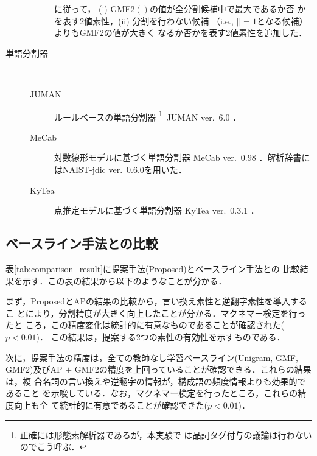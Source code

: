 \documentclass[japanese]{jnlp_1.4}
\newcommand{\y}{}
\begin{document}
\begin{description}
\begin{description}
			\citeyear{AlfonsecaCICLing08}に従って，
			(i) GMF2$(\y)$の値が全分割候補中で最大であるか否
			かを表す2値素性，(ii) 分割を行わない候補
			（i.e., $|\y|=1$となる候補）よりもGMF2の値が大きく
			なるか否かを表す2値素性を追加した．
	    \end{description}
 \item[単語分割器]　
	    \begin{description}
	     \item[JUMAN]
			ルールベースの単語分割器
			\footnote{正確には形態素解析器であるが，本実験で
			は品詞タグ付与の議論は行わないのでこう呼ぶ．}\ JUMAN ver.~6.0 \cite{Kurohashi94}．
	     \item[MeCab]
			対数線形モデルに基づく単語分割器 
			MeCab ver.~0.98 \cite{Kudo04}．解析辞書にはNAIST-jdic
			ver.~0.6.0を用いた．
	     \item[KyTea]
			点推定モデルに基づく単語分割器 KyTea ver.~0.3.1 \cite{Neubig11}．
	    \end{description}
\end{description}


\subsection{ベースライン手法との比較}
\label{sec:compare}

\begin{table}[b]
   \label{tab:comparison_result}

\vspace{-0.5\Cvs}
\end{table}

表\ref{tab:comparison_result}に提案手法(Proposed)とベースライン手法との
比較結果を示す．この表の結果から以下のようなことが分かる．

まず，ProposedとAPの結果の比較から，言い換え素性と逆翻字素性を導入するこ
とにより，分割精度が大きく向上したことが分かる．マクネマー検定を行ったと
ころ，この精度変化は統計的に有意なものであることが確認された($p<0.01$)．
この結果は，提案する2つの素性の有効性を示すものである．

次に，提案手法の精度は，全ての教師なし学習ベースライン(Unigram, GMF, GMF2)及びAP $+$ GMF2の精度を上回っていることが確認できる．これらの結果は，複
合名詞の言い換えや逆翻字の情報が，構成語の頻度情報よりも効果的であること
を示唆している．なお，マクネマー検定を行ったところ，これらの精度向上も全
て統計的に有意であることが確認できた($p<0.01$)．
\end{document}

